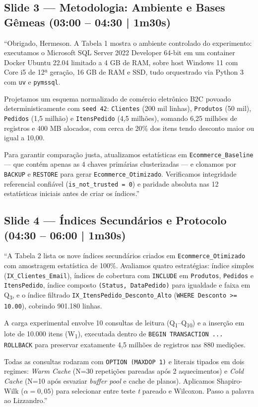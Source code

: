 \documentclass[10pt,a4paper]{article}
\begin{document}
\subsection{Slide 3 — Metodologia: Ambiente e Bases Gêmeas (03:00 – 04:30 | 1m30s)}
\begin{fala}
``Obrigado, Hermeson. A Tabela 1 mostra o ambiente controlado do experimento: executamos o Microsoft SQL Server 2022 Developer 64-bit em um container Docker Ubuntu 22.04 limitado a 4 GB de RAM, sobre host Windows 11 com Core i5 de 12ª geração, 16 GB de RAM e SSD, tudo orquestrado via Python 3 com \texttt{uv} e \texttt{pymssql}.

Projetamos um esquema normalizado de comércio eletrônico B2C povoado deterministicamente com \texttt{seed 42}: \texttt{Clientes} (200 mil linhas), \texttt{Produtos} (50 mil), \texttt{Pedidos} (1,5 milhão) e \texttt{ItensPedido} (4,5 milhões), somando 6,25 milhões de registros e 400 MB alocados, com cerca de 20\% dos itens tendo desconto maior ou igual a 10,00.

Para garantir comparação justa, atualizamos estatísticas em \texttt{Ecommerce\_Baseline} — que contém apenas as 4 chaves primárias clusterizadas — e clonamos por \texttt{BACKUP} e \texttt{RESTORE} para gerar \texttt{Ecommerce\_Otimizado}. Verificamos integridade referencial confiável (\texttt{is\_not\_trusted = 0}) e paridade absoluta nas 12 estatísticas iniciais antes de criar os índices.''
\end{fala}

\subsection{Slide 4 — Índices Secundários e Protocolo (04:30 – 06:00 | 1m30s)}
\begin{fala}
``A Tabela 2 lista os nove índices secundários criados em \texttt{Ecommerce\_Otimizado} com amostragem estatística de 100\%. Avaliamos quatro estratégias: índice simples (\texttt{IX\_Clientes\_Email}), índices de cobertura com \texttt{INCLUDE} em \texttt{Produtos}, \texttt{Pedidos} e \texttt{ItensPedido}, índice composto \texttt{(Status, DataPedido)} para igualdade e faixa em Q\textsubscript{3}, e o índice filtrado \texttt{IX\_ItensPedido\_Desconto\_Alto} (\texttt{WHERE Desconto >= 10.00}), cobrindo 901.180 linhas.

A carga experimental envolve 10 consultas de leitura (Q\textsubscript{1}–Q\textsubscript{10}) e a inserção em lote de 10.000 itens (W\textsubscript{1}), executada dentro de \texttt{BEGIN TRANSACTION ... ROLLBACK} para preservar exatamente 4,5 milhões de registros nas 880 medições.

Todas as consultas rodaram com \texttt{OPTION (MAXDOP 1)} e literais tipados em dois regimes: \textit{Warm Cache} (N=30 repetições pareadas após 2 aquecimentos) e \textit{Cold Cache} (N=10 após esvaziar \textit{buffer pool} e cache de planos). Aplicamos Shapiro-Wilk ($\alpha = 0{,}05$) para selecionar entre teste \textit{t} pareado e Wilcoxon. Passo a palavra ao Lizzandro.''
\end{fala}
\end{document}
